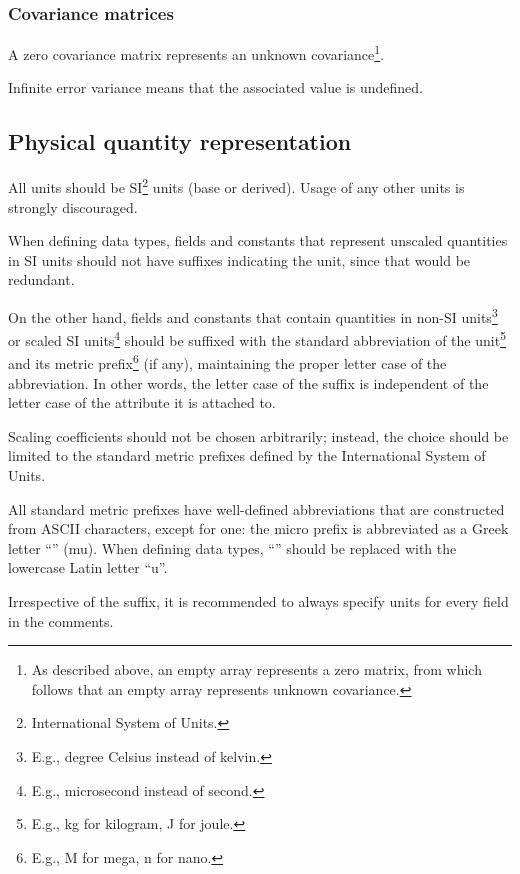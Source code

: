 \subsubsection{Covariance matrices}

A zero covariance matrix represents an unknown covariance\footnote{%
    As described above, an empty array represents a zero matrix,
    from which follows that an empty array represents unknown covariance.
}.

Infinite error variance means that the associated value is undefined.

\subsection{Physical quantity representation}

All units should be SI\footnote{International System of Units.} units (base or derived).
Usage of any other units is strongly discouraged.

When defining data types, fields and constants that represent unscaled quantities in SI units
should not have suffixes indicating the unit, since that would be redundant.

On the other hand, fields and constants that contain quantities in
non-SI units\footnote{E.g., degree Celsius instead of kelvin.}
or scaled SI units\footnote{E.g., microsecond instead of second.}
should be suffixed with the standard abbreviation of the unit\footnote{E.g., kg for kilogram, J for joule.}
and its metric prefix\footnote{E.g., M for mega, n for nano.}
(if any), maintaining the proper letter case of the abbreviation.
In other words, the letter case of the suffix is independent of the letter case of
the attribute it is attached to.

Scaling coefficients should not be chosen arbitrarily;
instead, the choice should be limited to the standard metric prefixes defined by the
International System of Units.

All standard metric prefixes have well-defined abbreviations that are constructed from ASCII characters,
except for one: the micro prefix is abbreviated as a Greek letter ``\textmu{}'' (mu).
When defining data types, ``\textmu{}'' should be replaced with the lowercase Latin letter ``u''.

Irrespective of the suffix, it is recommended to always specify units for every field in the comments.


